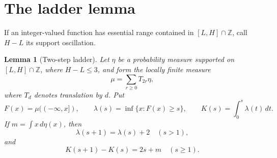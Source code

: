 \documentclass[11pt]{article}
\newtheorem{lemma}[theorem]{Lemma}
\newcommand{\Z}{\mathbb Z}
\begin{document}
\section{The ladder lemma}

If an integer-valued function has essential range contained in
\([L,H]\cap\Z\), call \(H-L\) its support oscillation.

\begin{lemma}[Two-step ladder]
Let \(\eta\) be a probability measure supported on
\([L,H]\cap\Z\), where \(H-L\leq3\), and form the locally finite measure
\[
 \mu=\sum_{r\geq0}T_{2r}\eta,
\]
where \(T_d\) denotes translation by \(d\).  Put
\[
 F(x)=\mu(({-}\infty,x]),\qquad
 \lambda(s)=\inf\{x:F(x)\geq s\},\qquad
 K(s)=\int_0^s\lambda(t)\,dt.
\]
If \(m=\int x\,d\eta(x)\), then
\[
 \lambda(s+1)=\lambda(s)+2\quad(s>1),                           \tag{4}
\]
and
\[
 K(s+1)-K(s)=2s+m\quad(s\geq1).                                \tag{5}
\]
\end{lemma}
\end{document}
